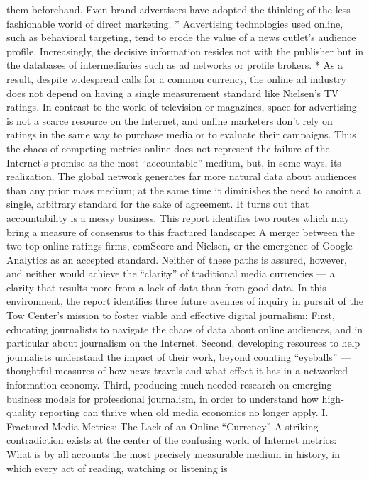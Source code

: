 them beforehand. Even brand advertisers have adopted the thinking of
the less‐fashionable world of direct marketing.
* Advertising technologies used online, such as behavioral targeting, tend
to erode the value of a news outlet’s audience profile. Increasingly, the
decisive information resides not with the publisher but in the databases of
intermediaries such as ad networks or profile brokers.
* As a result, despite widespread calls for a common currency, the online
ad industry does not depend on having a single measurement standard
like Nielsen’s TV ratings. In contrast to the world of television or
magazines, space for advertising is not a scarce resource on the Internet,
and online marketers don’t rely on ratings in the same way to purchase
media or to evaluate their campaigns.
Thus the chaos of competing metrics online does not represent the failure
of the Internet’s promise as the most ``accountable'' medium, but, in some
ways, its realization. The global network generates far more natural data
about audiences than any prior mass medium; at the same time it
diminishes the need to anoint a single, arbitrary standard for the sake of
agreement. It turns out that accountability is a messy business.
This report identifies two routes which may bring a measure of consensus
to this fractured landscape: A merger between the two top online ratings
firms, comScore and Nielsen, or the emergence of Google Analytics as an
accepted standard. Neither of these paths is assured, however, and neither
would achieve the ``clarity'' of traditional media currencies — a clarity
that results more from a lack of data than from good data.
In this environment, the report identifies three future avenues of inquiry
in pursuit of the Tow Center’s mission to foster viable and effective digital
journalism:
First, educating journalists to navigate the chaos of data about online audiences,
and in particular about journalism on the Internet.
Second, developing resources to help journalists understand the impact of their
work, beyond counting ``eyeballs'' — thoughtful measures of how news travels
and what effect it has in a networked information economy.
Third, producing much‐needed research on emerging business models for
professional journalism, in order to understand how high‐quality reporting can
thrive when old media economics no longer apply.
I. Fractured Media Metrics: The Lack of an Online ``Currency''
A striking contradiction exists at the center of the confusing world of
Internet metrics: What is by all accounts the most precisely measurable
medium in history, in which every act of reading, watching or listening is
